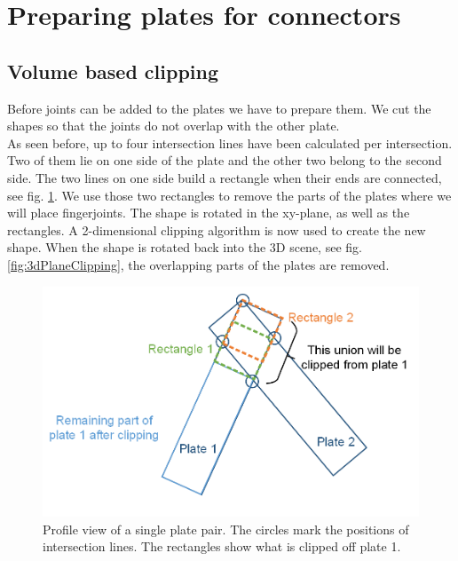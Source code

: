 \documentclass[../ClassicThesis.tex]{subfiles}
\begin{document}
\section{Preparing plates for connectors}
\subsection{Volume based clipping}
Before joints can be added to the plates we have to prepare them. We cut the shapes so that the joints do not overlap with the other plate.\\
As seen before, up to four intersection lines have been calculated per intersection. Two of them lie on one side of the plate and the other two belong to the second side. The two lines on one side build a rectangle when their ends are connected, see fig. \ref{fig:clippingPlate}. We use those two rectangles to remove the parts of the plates where we will place fingerjoints. The shape is rotated in the xy-plane, as well as the rectangles. A 2-dimensional clipping algorithm is now used to create the new shape. When the shape is rotated back into the 3D scene, see fig. \ref{fig:3dPlaneClipping}, the overlapping parts of the plates are removed.
\begin{figure}[!ht]
\centering
\includegraphics[width=\columnwidth]{Images/10-joints-clippingPlate.png}
\caption{Profile view of a single plate pair. The circles mark the positions of intersection lines. The rectangles show what is clipped off plate 1. }
\label{fig:clippingPlate}
\end{figure}
\end{document}
